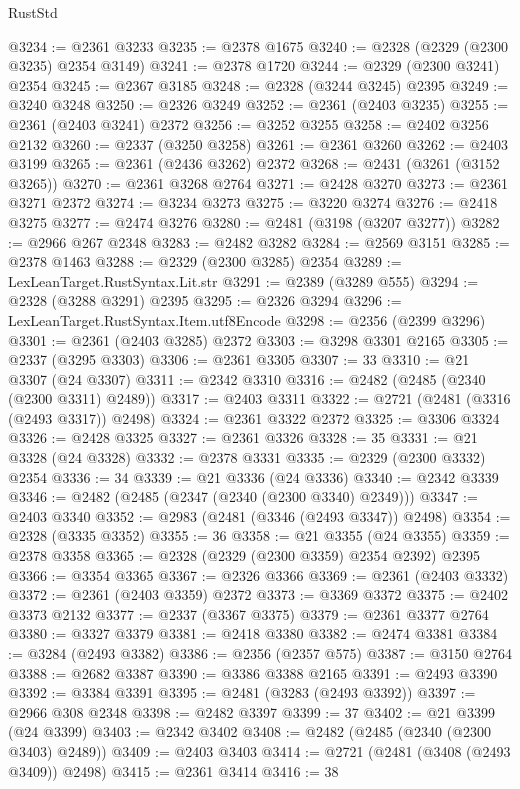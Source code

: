 \begin{lexlean}{RustStd}
\begin{coremodule}
{\begin{coremodule}
{{{{{{{{{{{{{{{{{{{{{{{{{{{{{{{{{{{{{@3234 := @2361 @3233
@3235 := @2378 @1675
@3240 := @2328 (@2329 (@2300 @3235) @2354 @3149)
@3241 := @2378 @1720
@3244 := @2329 (@2300 @3241) @2354
@3245 := @2367 @3185
@3248 := @2328 (@3244 @3245) @2395
@3249 := @3240 @3248
@3250 := @2326 @3249
@3252 := @2361 (@2403 @3235)
@3255 := @2361 (@2403 @3241) @2372
@3256 := @3252 @3255
@3258 := @2402 @3256 @2132
@3260 := @2337 (@3250 @3258)
@3261 := @2361 @3260
@3262 := @2403 @3199
@3265 := @2361 (@2436 @3262) @2372
@3268 := @2431 (@3261 (@3152 @3265))
@3270 := @2361 @3268 @2764
@3271 := @2428 @3270
@3273 := @2361 @3271 @2372
@3274 := @3234 @3273
@3275 := @3220 @3274
@3276 := @2418 @3275
@3277 := @2474 @3276
@3280 := @2481 (@3198 (@3207 @3277))
@3282 := @2966 @267 @2348
@3283 := @2482 @3282
@3284 := @2569 @3151
@3285 := @2378 @1463
@3288 := @2329 (@2300 @3285) @2354
@3289 := LexLeanTarget.RustSyntax.Lit.str
@3291 := @2389 (@3289 @555)
@3294 := @2328 (@3288 @3291) @2395
@3295 := @2326 @3294
@3296 := LexLeanTarget.RustSyntax.Item.utf8Encode
@3298 := @2356 (@2399 @3296)
@3301 := @2361 (@2403 @3285) @2372
@3303 := @3298 @3301 @2165
@3305 := @2337 (@3295 @3303)
@3306 := @2361 @3305
@3307 := 33
@3310 := @21 @3307 (@24 @3307)
@3311 := @2342 @3310
@3316 := @2482 (@2485 (@2340 (@2300 @3311) @2489))
@3317 := @2403 @3311
@3322 := @2721 (@2481 (@3316 (@2493 @3317)) @2498)
@3324 := @2361 @3322 @2372
@3325 := @3306 @3324
@3326 := @2428 @3325
@3327 := @2361 @3326
@3328 := 35
@3331 := @21 @3328 (@24 @3328)
@3332 := @2378 @3331
@3335 := @2329 (@2300 @3332) @2354
@3336 := 34
@3339 := @21 @3336 (@24 @3336)
@3340 := @2342 @3339
@3346 := @2482 (@2485 (@2347 (@2340 (@2300 @3340) @2349)))
@3347 := @2403 @3340
@3352 := @2983 (@2481 (@3346 (@2493 @3347)) @2498)
@3354 := @2328 (@3335 @3352)
@3355 := 36
@3358 := @21 @3355 (@24 @3355)
@3359 := @2378 @3358
@3365 := @2328 (@2329 (@2300 @3359) @2354 @2392) @2395
@3366 := @3354 @3365
@3367 := @2326 @3366
@3369 := @2361 (@2403 @3332)
@3372 := @2361 (@2403 @3359) @2372
@3373 := @3369 @3372
@3375 := @2402 @3373 @2132
@3377 := @2337 (@3367 @3375)
@3379 := @2361 @3377 @2764
@3380 := @3327 @3379
@3381 := @2418 @3380
@3382 := @2474 @3381
@3384 := @3284 (@2493 @3382)
@3386 := @2356 (@2357 @575)
@3387 := @3150 @2764
@3388 := @2682 @3387
@3390 := @3386 @3388 @2165
@3391 := @2493 @3390
@3392 := @3384 @3391
@3395 := @2481 (@3283 (@2493 @3392))
@3397 := @2966 @308 @2348
@3398 := @2482 @3397
@3399 := 37
@3402 := @21 @3399 (@24 @3399)
@3403 := @2342 @3402
@3408 := @2482 (@2485 (@2340 (@2300 @3403) @2489))
@3409 := @2403 @3403
@3414 := @2721 (@2481 (@3408 (@2493 @3409)) @2498)
@3415 := @2361 @3414
@3416 := 38
}}}}}}}}}}}}}}}}}}}}}}}}}}}}}}}}}}}}}
\end{coremodule}}
\end{coremodule}
\end{lexlean}
